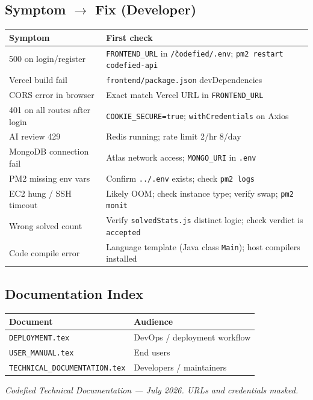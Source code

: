 \documentclass[11pt,a4paper]{article}
\begin{document}
\subsection{Symptom $\rightarrow$ Fix (Developer)}
\begin{table}[h]
\centering
\small
\begin{tabular}{@{}lp{7.8cm}@{}}
\toprule
\textbf{Symptom} & \textbf{First check} \\
\midrule
500 on login/register & \texttt{FRONTEND\_URL} in \texttt{\~/codefied/.env}; \texttt{pm2 restart codefied-api} \\
Vercel build fail & \texttt{frontend/package.json} devDependencies \\
CORS error in browser & Exact match Vercel URL in \texttt{FRONTEND\_URL} \\
401 on all routes after login & \texttt{COOKIE\_SECURE=true}; \texttt{withCredentials} on Axios \\
AI review 429 & Redis running; rate limit 2/hr 8/day \\
MongoDB connection fail & Atlas network access; \texttt{MONGO\_URI} in \texttt{.env} \\
PM2 missing env vars & Confirm \texttt{../.env} exists; check \texttt{pm2 logs} \\
EC2 hung / SSH timeout & Likely OOM; check instance type; verify swap; \texttt{pm2 monit} \\
Wrong solved count & Verify \texttt{solvedStats.js} distinct logic; check verdict is \texttt{accepted} \\
Code compile error & Language template (Java class \texttt{Main}); host compilers installed \\
\bottomrule
\end{tabular}
\end{table}

\subsection{Documentation Index}
\begin{table}[h]
\centering
\small
\begin{tabular}{@{}ll@{}}
\toprule
\textbf{Document} & \textbf{Audience} \\
\midrule
\texttt{DEPLOYMENT.tex} & DevOps / deployment workflow \\
\texttt{USER\_MANUAL.tex} & End users \\
\texttt{TECHNICAL\_DOCUMENTATION.tex} & Developers / maintainers \\
\bottomrule
\end{tabular}
\end{table}

\vfill
\begin{center}
\small\textit{Codefied Technical Documentation --- July 2026. URLs and credentials masked.}
\end{center}
\end{document}

